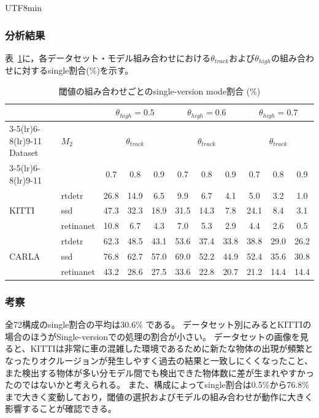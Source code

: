 \documentclass[conference, dvipdfmx]{IEEEtran}
\begin{document}
\begin{CJK}{UTF8}{min}
\subsubsection{分析結果}

表~\ref{tab:sensitivity}に，各データセット・モデル組み合わせにおける$\theta_{track}$および$\theta_{high}$の組み合わせに対するsingle割合(\%)を示す。

\begin{table}[t]
  \centering
  \caption{閾値の組み合わせごとのsingle-version mode割合 (\%)}
  \label{tab:sensitivity}
  \setlength{\tabcolsep}{4pt}
  \begin{tabular}{llccccccccc}
    \toprule
    & & \multicolumn{3}{c}{$\theta_{high}=0.5$} & \multicolumn{3}{c}{$\theta_{high}=0.6$} & \multicolumn{3}{c}{$\theta_{high}=0.7$} \\
    \cmidrule(lr){3-5}\cmidrule(lr){6-8}\cmidrule(lr){9-11}
    Dataset & $M_2$ & \multicolumn{3}{c}{$\theta_{track}$} & \multicolumn{3}{c}{$\theta_{track}$} & \multicolumn{3}{c}{$\theta_{track}$} \\
    \cmidrule(lr){3-5}\cmidrule(lr){6-8}\cmidrule(lr){9-11}
    & & 0.7 & 0.8 & 0.9 & 0.7 & 0.8 & 0.9 & 0.7 & 0.8 & 0.9 \\
    \midrule
    \multirow{3}{*}{KITTI}
    & rtdetr    & 26.8 & 14.9 &  6.5 &  9.9 &  6.7 &  4.1 &  5.0 &  3.2 &  1.0 \\
    & ssd       & 47.3 & 32.3 & 18.9 & 31.5 & 14.3 &  7.8 & 24.1 &  8.4 &  3.1 \\
    & retinanet & 10.8 &  6.7 &  4.3 &  7.0 &  5.3 &  2.9 &  4.4 &  2.6 &  0.5 \\
    \midrule
    \multirow{3}{*}{CARLA}
    & rtdetr    & 62.3 & 48.5 & 43.1 & 53.6 & 37.4 & 33.8 & 38.8 & 29.0 & 26.2 \\
    & ssd       & 76.8 & 62.7 & 57.0 & 69.0 & 52.2 & 44.9 & 52.4 & 35.6 & 30.8 \\
    & retinanet & 43.2 & 28.6 & 27.5 & 33.6 & 22.8 & 20.7 & 21.2 & 14.4 & 14.4 \\
    \bottomrule
  \end{tabular}
\end{table}

\subsubsection{考察}

全72構成のsingle割合の平均は30.6\% である。
データセット別にみるとKITTIの場合のほうがSingle-versionでの処理の割合が小さい。
データセットの画像を見ると、KITTIは非常に車の混雑した環境であるために新たな物体の出現が頻繁となったりオクルージョンが発生しやすく過去の結果と一致しにくくなったこと、また検出する物体が多い分モデル間でも検出できた物体数に差が生まれやすかったのではないかと考えられる。
また、構成によってsingle割合は0.5\%から76.8\%まで大きく変動しており，閾値の選択およびモデルの組み合わせが動作に大きく影響することが確認できる。


\end{CJK}
\end{document}
